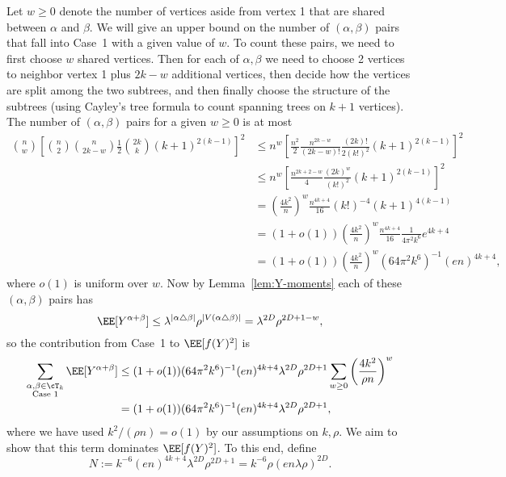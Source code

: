 \documentclass[11pt]{article}
\begin{document}
Let $w \ge 0$ denote the number of vertices aside from vertex 1 that are shared between $\alpha$ and $\beta$. We will give an upper bound on the number of $(\alpha,\beta)$ pairs that fall into Case~1 with a given value of $w$. To count these pairs, we need to first choose $w$ shared vertices. Then for each of $\alpha,\beta$ we need to choose 2 vertices to neighbor vertex 1 plus $2k-w$ additional vertices, then decide how the vertices are split among the two subtrees, and then finally choose the structure of the subtrees (using Cayley's tree formula to count spanning trees on $k+1$ vertices). The number of $(\alpha,\beta)$ pairs for a given $w \ge 0$ is at most
\begin{align*}
\binom{n}{w} \left[\binom{n}{2} \binom{n}{2k-w} \frac{1}{2}\binom{2k}{k} (k+1)^{2(k-1)}\right]^2 &\le n^w \left[\frac{n^2}{2} \frac{n^{2k-w}}{(2k-w)!} \frac{(2k)!}{2(k!)^2} (k+1)^{2(k-1)}\right]^2 \\
&\le n^w \left[\frac{n^{2k+2-w}}{4} \frac{(2k)^w}{(k!)^2} (k+1)^{2(k-1)}\right]^2 \\
&= \left(\frac{4k^2}{n}\right)^w \frac{n^{4k+4}}{16} (k!)^{-4} (k+1)^{4(k-1)} \\
&= (1+o(1)) \left(\frac{4k^2}{n}\right)^w \frac{n^{4k+4}}{16} \frac{1}{4\pi^2 k^6} e^{4k+4} \\
&= (1+o(1)) \left(\frac{4k^2}{n}\right)^w (64 \pi^2 k^6)^{-1} (en)^{4k+4},
\end{align*}
where $o(1)$ is uniform over $w$. Now by Lemma~\ref{lem:Y-moments} each of these $(\alpha,\beta)$ pairs has
\[ \EE[Y^{\alpha+\beta}] \le \lambda^{|\alpha \triangle \beta|} \rho^{|V(\alpha \triangle \beta)|} = \lambda^{2D} \rho^{2D+1-w}, \]
so the contribution from Case~1 to $\EE[f(Y)^2]$ is
\begin{align*}
\sum_{\substack{\alpha,\beta \in \cT_k \\ \textnormal{Case 1}}} \EE[Y^{\alpha+\beta}] &\le (1+o(1)) (64 \pi^2 k^6)^{-1} (en)^{4k+4} \lambda^{2D} \rho^{2D+1} \sum_{w \ge 0} \left(\frac{4k^2}{\rho n}\right)^w \\
&= (1+o(1)) (64 \pi^2 k^6)^{-1} (en)^{4k+4} \lambda^{2D} \rho^{2D+1},
\end{align*}
where we have used $k^2/(\rho n) = o(1)$ by our assumptions on $k,\rho$. We aim to show that this term dominates $\EE[f(Y)^2]$. To this end, define
\begin{equation}\label{eq:def-N}
N := k^{-6} (en)^{4k+4} \lambda^{2D} \rho^{2D+1} = k^{-6} \rho (en\lambda\rho)^{2D}.
\end{equation}
\end{document}
